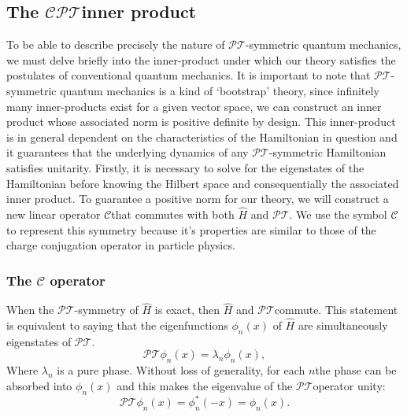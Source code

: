 \documentclass[12pt, a4paper]{report}
\newcommand\PT{\(\mathcal{PT}\)}
\newcommand\CC{\(\mathcal{C}\)}
\begin{document}
\subsection{The \texorpdfstring{$\mathcal{CPT}$}\:\:inner product}\label{CPT}
To be able to describe precisely the nature of \PT-symmetric quantum mechanics, we must delve briefly into the inner-product under which our theory satisfies the postulates of conventional quantum mechanics. It is important to note that \PT-symmetric quantum mechanics is a kind of `bootstrap' theory\cite{MakingSense}, since infinitely many inner-products exist for a given vector space, we can construct an inner product whose associated norm is positive definite by design. This inner-product is in general dependent on the characteristics of the Hamiltonian in question and it guarantees that the underlying dynamics of any \PT-symmetric Hamiltonian satisfies unitarity\cite{MustaHbeHermitian}.
Firstly, it is necessary to solve for the eigenstates of the Hamiltonian before knowing the Hilbert space and consequentially the associated inner product.
To guarantee a positive norm for our theory, we will construct a new linear operator \CC\:that commutes with both $\hat{H}$ and \PT. We use the symbol \CC\: to represent this symmetry because it's properties are similar to those of the charge conjugation operator in particle physics\cite{MakingSense}.

\subsubsection{The $\mathcal{C}$ operator}\label{CC}
When the \PT-symmetry of $\hat{H}$ is exact, then $\hat{H}$ and \PT\:commute. This statement is equivalent to saying that the eigenfunctions $\phi_n(x)$ of $\hat{H}$ are simultaneously eigenstates of \PT\cite{Bender_2004}.
\begin{equation}\label{eq:3}
\mathcal{PT}\phi_n(x) = \lambda_n \phi_n(x),
\end{equation}
Where $\lambda_n$ is a pure phase. Without loss of generality, for each $n$\:the phase can be absorbed into $\phi_n(x)$ and this makes the eigenvalue of the \PT operator unity\cite{Bender_2004}: 
\begin{equation}\label{eq:4}
\mathcal{PT}\phi_n(x) = \phi_{n}^{*}(-x) = \phi_n(x).
\end{equation}
\end{document}
